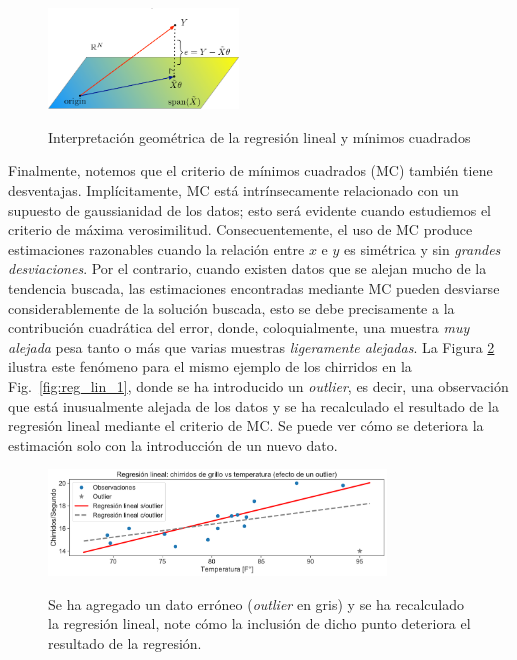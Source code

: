 \begin{figure}[t]
	\centering
	\includegraphics[width=0.45\textwidth]{img/cap2_intuicionLinReg.pdf}\\
	\caption{Interpretación geométrica de la regresión lineal y mínimos cuadrados}
	\label{fig:projection}
\end{figure}


Finalmente, notemos que el criterio de  mínimos cuadrados (MC) también tiene desventajas. Implícitamente, MC está intrínsecamente relacionado con un supuesto de gaussianidad de los datos; esto será evidente cuando estudiemos el criterio de máxima verosimilitud. Consecuentemente, el uso de MC produce estimaciones razonables cuando la relación entre $x$  e $y$ es simétrica y sin \emph{grandes desviaciones}. Por el contrario, cuando existen datos que se alejan mucho de la tendencia buscada, las estimaciones encontradas mediante MC pueden desviarse considerablemente de la solución buscada, esto se debe precisamente a la contribución cuadrática del error, donde, coloquialmente, una muestra \emph{muy alejada} pesa tanto o más que varias muestras \emph{ligeramente alejadas}. La Figura \ref{fig:reg_lin_2} ilustra este fenómeno para el mismo ejemplo de los chirridos en la Fig.~\ref{fig:reg_lin_1}, donde se ha introducido un \emph{outlier}, es decir, una observación que está inusualmente alejada de los datos y se ha recalculado el resultado de la regresión lineal mediante el criterio de MC. Se puede ver cómo se deteriora la estimación solo con la introducción de un nuevo dato. 

\begin{figure}[H]
	\centering
	\includegraphics[width=0.8\textwidth]{img/cap2_chirridos_outlier.pdf}\\
	\caption{Se ha agregado un dato erróneo (\emph{outlier} en gris) y se ha recalculado la regresión lineal, note cómo la inclusión de dicho punto deteriora el resultado de la regresión.}
	\label{fig:reg_lin_2}
\end{figure}

